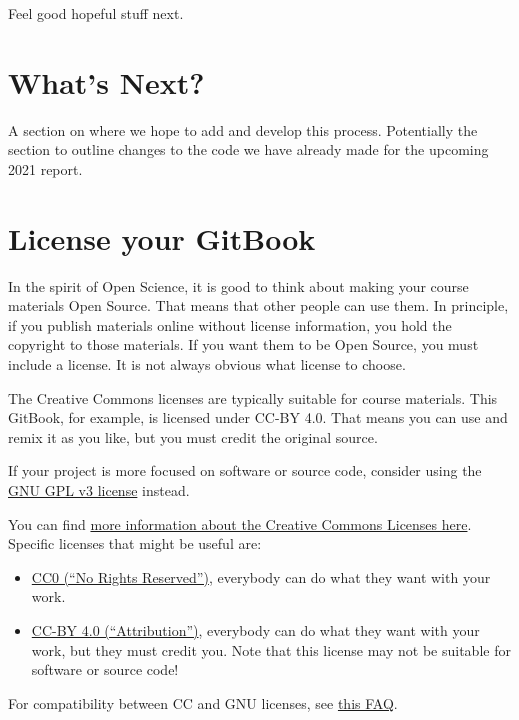 \documentclass[
]{book}
\providecommand{\tightlist}{%
  \setlength{\itemsep}{0pt}\setlength{\parskip}{0pt}}
\begin{document}
Feel good hopeful stuff next.

\hypertarget{whats-next}{%
\chapter{What's Next?}\label{whats-next}}

A section on where we hope to add and develop this process. Potentially the section to outline changes to the code we have already made for the upcoming 2021 report.

\hypertarget{license-your-gitbook}{%
\chapter{License your GitBook}\label{license-your-gitbook}}

In the spirit of Open Science, it is good to think about making your course materials Open Source. That means that other people can use them. In principle, if you publish materials online without license information, you hold the copyright to those materials. If you want them to be Open Source, you must include a license. It is not always obvious what license to choose.

The Creative Commons licenses are typically suitable for course materials. This GitBook, for example, is licensed under CC-BY 4.0. That means you can use and remix it as you like, but you must credit the original source.

If your project is more focused on software or source code, consider using the \href{https://www.gnu.org/licenses/gpl-3.0.en.html}{GNU GPL v3 license} instead.

You can find \href{https://creativecommons.org/share-your-work/licensing-examples}{more information about the Creative Commons Licenses here}. Specific licenses that might be useful are:

\begin{itemize}
\tightlist
\item
  \href{https://creativecommons.org/share-your-work/public-domain/cc0/}{CC0 (``No Rights Reserved'')}, everybody can do what they want with your work.
\item
  \href{https://creativecommons.org/licenses/by/4.0/}{CC-BY 4.0 (``Attribution'')}, everybody can do what they want with your work, but they must credit you. Note that this license may not be suitable for software or source code!
\end{itemize}

For compatibility between CC and GNU licenses, see \href{https://creativecommons.org/faq/\#Can_I_apply_a_Creative_Commons_license_to_software.3F}{this FAQ}.

  
\end{document}
